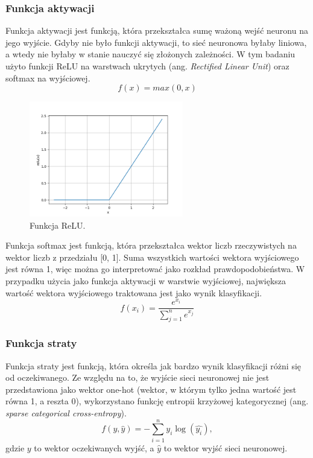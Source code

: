 \subsubsection{Funkcja aktywacji}\label{subsubsec:funkcja_aktywacji}
Funkcja aktywacji jest funkcją, która przekształca sumę ważoną wejść neuronu na jego wyjście.
Gdyby nie było funkcji aktywacji, to sieć neuronowa byłaby liniowa, a wtedy nie byłaby w stanie nauczyć się złożonych zależności.
W tym badaniu użyto funkcji ReLU na warstwach ukrytych (ang. \textit{Rectified Linear Unit}) oraz softmax na wyjściowej.
\begin{equation}
    f(x) = max(0, x)
\end{equation}
\begin{figure}[H]
    \centering
    \includegraphics[width=0.6\textwidth]{img/relu.png}
    \caption{Funkcja ReLU.}
    \label{fig:relu}
\end{figure}
Funkcja softmax jest funkcją, która przekształca wektor liczb rzeczywistych na wektor liczb z przedziału [0, 1].
Suma wszystkich wartości wektora wyjściowego jest równa 1, więc można go interpretować jako rozkład prawdopodobieństwa.
W przypadku użycia jako funkcja aktywacji w warstwie wyjściowej, największa wartość wektora wyjściowego traktowana jest jako wynik klasyfikacji.
\begin{equation}
    \label{eq:softmax}
    f(x_i) = \frac{e^{x_i}}{\sum_{j=1}^{n} e^{x_j}}
\end{equation}
\subsubsection{Funkcja straty}\label{subsubsec:funkcja_straty}
Funkcja straty jest funkcją, która określa jak bardzo wynik klasyfikacji różni się od oczekiwanego.
Ze względu na to, że wyjście sieci neuronowej nie jest przedstawiona jako wektor one-hot
(wektor, w którym tylko jedna wartość jest równa 1, a reszta 0),
wykorzystano funkcję entropii krzyżowej kategorycznej (ang. \textit{sparse categorical cross-entropy}).
\begin{equation}
    f(y, \hat{y}) = -\sum_{i=1}^{n} y_i \log(\hat{y_i}),
\end{equation}
gdzie $y$ to wektor oczekiwanych wyjść, a $\hat{y}$ to wektor wyjść sieci neuronowej.
